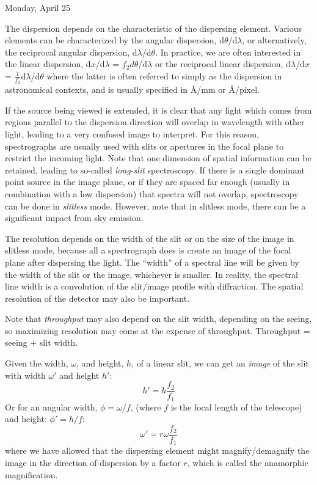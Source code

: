 \documentclass[12pt]{article}
\begin{document}
{\small\hfill\textcolor{date}{Monday, April 25}}

The dispersion depends on the characteristic of the dispersing
element. Various elements can be characterized by the angular
dispersion, d$\theta$/d$\lambda$, or alternatively, the reciprocal
angular dispersion, d$\lambda$/d$\theta$.
In practice, we are often interested in the linear dispersion,
d$x$/d$\lambda$ = $f_{2}d\theta$/d$\lambda$ or the reciprocal linear
dispersion, d$\lambda$/d$x$ = $\frac{1}{f_{2}}$d$\lambda$/d$\theta$
where the latter is often referred
to simply as the dispersion in astronomical contexts, and is usually
specified in \AA{}/mm or \AA{}/pixel.

If the source being viewed is extended, it is clear that any light
which comes from regions parallel to the dispersion direction will
overlap in wavelength with other light, leading to a very confused
image to interpret. For this reason, spectrographs are usually used
with slits or apertures in the focal plane to restrict the incoming
light. Note that one dimension of spatial information can be retained,
leading to so-called \emph{long-slit} spectroscopy. If there is a single
dominant point source in the image plane, or if they are spaced far
enough (usually in combination with a low dispersion) that spectra
will not overlap, spectroscopy can be done in \emph{slitless} mode. However,
note that in slitless mode, there can be a significant impact
from sky emission.

The resolution depends on the width of the slit or on the size of the
image in slitless mode, because all a spectrograph does is create an
image of the focal plane after dispersing the light. The ``width'' of
a spectral line will be given by the width of the slit or the image,
whichever is smaller. In reality, the spectral line width is a
convolution of the slit/image profile with diffraction. The spatial
resolution of the detector may also be important.

Note that \emph{throughput} may also depend on the slit width, depending on
the seeing, so maximizing resolution may come at the expense of
throughput. Throughput = seeing + slit width.

Given the width, $\omega$, and height, $h$, of a linear slit,
we can get an \emph{image} of the slit with width $\omega'$ and
height $h'$:
$$ h' = h\frac{f_{2}}{f_{1}} $$
Or for an angular width, $\phi = \omega/f$,
(where $f$ is the focal length of the telescope) and height:
$\phi' = h/f$:
$$ \omega' = r\omega\frac{f_{2}}{f_{1}} $$
where we have allowed that the dispersing element might
magnify/demagnify the image in the direction of dispersion by a factor
$r$, which is called the anamorphic magnification.
\end{document}
